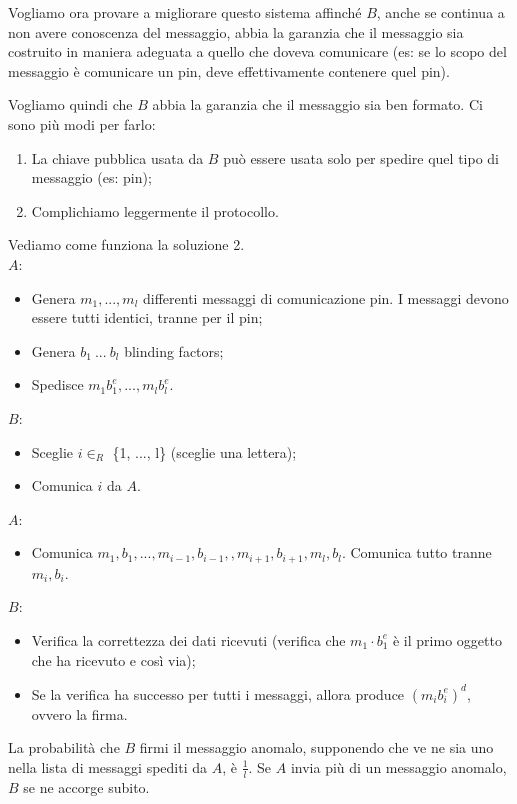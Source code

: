 \noindent Vogliamo ora provare a migliorare questo sistema affinché $B$, anche se continua a non avere conoscenza del messaggio, abbia la garanzia che il messaggio sia costruito in maniera adeguata a quello che doveva comunicare (es: se lo scopo del messaggio è comunicare un pin, deve effettivamente contenere quel pin). 

Vogliamo quindi che $B$ abbia la garanzia che il messaggio sia ben formato. Ci sono più modi per farlo:
\begin{enumerate}
    \item La chiave pubblica usata da $B$ può essere usata solo per spedire quel tipo di messaggio (es: pin);
    \item Complichiamo leggermente il protocollo.
\end{enumerate}

\noindent Vediamo come funziona la soluzione 2.
\\

\noindent $A$:
\begin{itemize}
    \item Genera $m_1, ..., m_l$ differenti messaggi di comunicazione pin.  I messaggi devono essere tutti identici, tranne per il pin;
    \item Genera $b_1 \ ... \ b_l$ blinding factors;
    \item Spedisce $m_1b_1^e, ..., m_lb_l^e$.
\end{itemize}

\noindent $B$:
\begin{itemize}
    \item Sceglie $i \in_R$ \{1, ..., l\} (sceglie una lettera);
    \item Comunica $i$ da $A$.
\end{itemize}

\noindent $A$:
\begin{itemize}
    \item Comunica $m_1,b_1, ..., m_{i-1},b_{i-1},, m_{i+1},b_{i+1}, m_l,b_l$. Comunica tutto tranne $m_i, b_i$.
\end{itemize}

\noindent $B$:
\begin{itemize}
    \item Verifica la correttezza dei dati ricevuti (verifica che $m_1 \cdot b_1 ^e$ è il primo oggetto che ha ricevuto e così via);
    \item Se la verifica ha successo per tutti i messaggi, allora produce $(m_ib_i^e)^d$, ovvero la firma. 
\end{itemize}

\noindent La probabilità che $B$ firmi il messaggio anomalo, supponendo che ve ne sia uno nella lista di messaggi spediti da $A$, è $\frac{1}{l}$. Se $A$ invia più di un messaggio anomalo, $B$ se ne accorge subito.
\\















